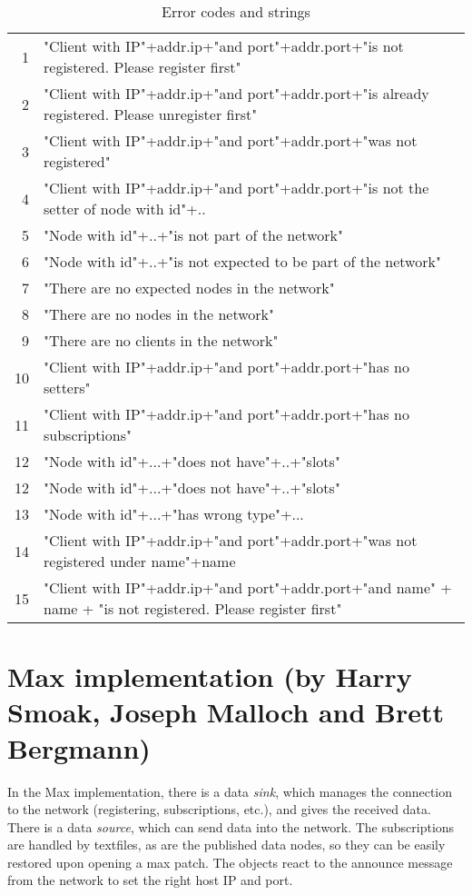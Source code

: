 \documentclass[letterpaper,10pt]{article}
\begin{document}
\begin{table}
\small
\begin{center}
\begin{tabular}{|rl|}
 \hline
  1 & "Client with IP"+addr.ip+"and port"+addr.port+"is not registered. Please register first" \\
  2 & "Client with IP"+addr.ip+"and port"+addr.port+"is already registered. Please unregister first" \\
  3 & "Client with IP"+addr.ip+"and port"+addr.port+"was not registered"  \\
  4 & "Client with IP"+addr.ip+"and port"+addr.port+"is not the setter of node with id"+..  \\
  5 & "Node with id"+..+"is not part of the network" \\
  6 & "Node with id"+..+"is not expected to be part of the network"  \\
  7 & "There are no expected nodes in the network" \\
  8 & "There are no nodes in the network"  \\
  9 & "There are no clients in the network"  \\
 10 & "Client with IP"+addr.ip+"and port"+addr.port+"has no setters"  \\
 11 & "Client with IP"+addr.ip+"and port"+addr.port+"has no subscriptions" \\
 12 & "Node with id"+...+"does not have"+..+"slots" \\
 12 & "Node with id"+...+"does not have"+..+"slots" \\
 13 & "Node with id"+...+"has wrong type"+... \\
 14 & "Client with IP"+addr.ip+"and port"+addr.port+"was not registered under name"+name \\
 15 & "Client with IP"+addr.ip+"and port"+addr.port+"and name" + name + "is not registered. Please register first" \\
 \hline
 \end{tabular}
\end{center}
\caption{Error codes and strings}
\label{errorcodes}
\end{table}


\section{Max implementation (by Harry Smoak, Joseph Malloch and Brett Bergmann)}
In the Max implementation, there is a data \textit{sink}, which manages the connection to the network (registering, subscriptions, etc.), and gives the received data. There is a data \textit{source}, which can send data into the network. The subscriptions are handled by textfiles, as are the published data nodes, so they can be easily restored upon opening a max patch.
The objects react to the announce message from the network to set the right host IP and port.
\end{document}
